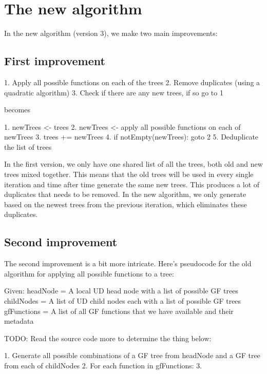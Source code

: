 \chapter{The new algorithm}


In the new algorithm (version 3), we make two main improvements:

\section{First improvement}

1. Apply all possible functions on each of the trees
2. Remove duplicates (using a quadratic algorithm)
3. Check if there are any new trees, if so go to 1

becomes

1. newTrees <- trees
2. newTrees <- apply all possible functions on each of newTrees
3. trees += newTrees
4. if notEmpty(newTrees): goto 2
5. Deduplicate the list of trees

In the first version, we only have one shared list of all the trees, both old and new trees mixed together. This means that the old trees will be used in every single iteration and time after time generate the same new trees. This produces a lot of duplicates that needs to be removed. In the new algorithm, we only generate based on the newest trees from the previous iteration, which eliminates these duplicates.



\section{Second improvement}

The second improvement is a bit more intricate. Here's pseudocode for the old algorithm for applying all possible functions to a tree:

Given:
headNode = A local UD head node with a list of possible GF trees
childNodes = A list of UD child nodes each with a list of possible GF trees
gfFunctions = A list of all GF functions that we have available and their metadata


TODO: Read the source code more to determine the thing below:

1. Generate all possible combinations of a GF tree from headNode and a GF tree from each of childNodes
2. For each function in gfFunctions:
3.    

